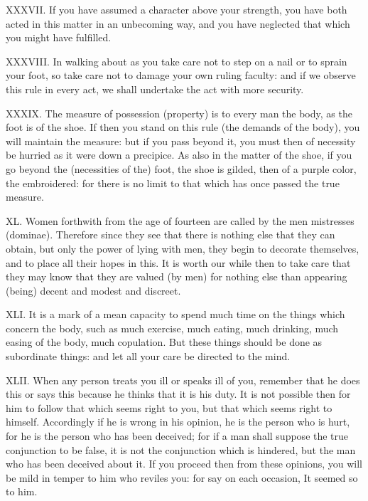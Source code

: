 XXXVII. If you have assumed a character above your strength, you have both acted in this matter in an unbecoming way, and you have neglected that which you might have fulfilled.



XXXVIII. In walking about as you take care not to step on a nail or to sprain your foot, so take care not to damage your own ruling faculty: and if we observe this rule in every act, we shall undertake the act with more security.



XXXIX. The measure of possession (property) is to every man the body, as the foot is of the shoe. If then you stand on this rule (the demands of the body), you will maintain the measure: but if you pass beyond it, you must then of necessity be hurried as it were down a precipice. As also in the matter of the shoe, if you go beyond the (necessities of the) foot, the shoe is gilded, then of a purple color, the embroidered: for there is no limit to that which has once passed the true measure.



XL. Women forthwith from the age of fourteen are called by the men mistresses (dominae). Therefore since they see that there is nothing else that they can obtain, but only the power of lying with men, they begin to decorate themselves, and to place all their hopes in this. It is worth our while then to take care that they may know that they are valued (by men) for nothing else than appearing (being) decent and modest and discreet.



XLI. It is a mark of a mean capacity to spend much time on the things which concern the body, such as much exercise, much eating, much drinking, much easing of the body, much copulation. But these things should be done as subordinate things: and let all your care be directed to the mind.



XLII. When any person treats you ill or speaks ill of you, remember that he does this or says this because he thinks that it is his duty. It is not possible then for him to follow that which seems right to you, but that which seems right to himself. Accordingly if he is wrong in his opinion, he is the person who is hurt, for he is the person who has been deceived; for if a man shall suppose the true conjunction to be false, it is not the conjunction which is hindered, but the man who has been deceived about it. If you proceed then from these opinions, you will be mild in temper to him who reviles you: for say on each occasion, It seemed so to him.



